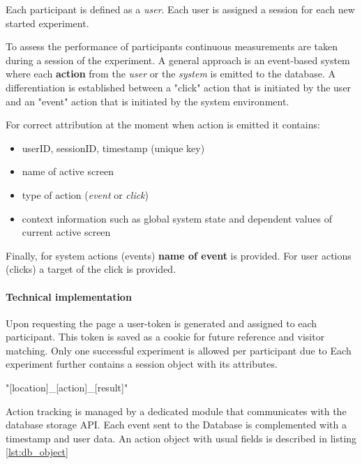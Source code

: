 	
	Each participant is defined as a \textit{user}. Each user is assigned a session for each new started experiment. 
	
	To assess the performance of participants continuous measurements are taken during a session of the experiment. A general approach is an event-based system where each \textbf{action} from the \textit{user} or the \textit{system} is emitted to the database. A differentiation is established between a "click" action that is initiated by the user and an "event" action that is initiated by the system environment.
	
	For correct attribution at the moment when action is emitted it contains: 
	\begin{itemize}
		\item userID, sessionID, timestamp (unique key)
		\item name of active screen
		\item type of action (\textit{event} or \textit{click})
		\item context information such as global system state and dependent values of current active screen
	\end{itemize}

	Finally, for system actions (events) \textbf{name of event} is provided. For user actions (clicks) a target of the click is provided.
	

	

		
		\paragraph{Technical implementation}
		
		Upon requesting the page a user-token is generated and assigned to each participant. This token is saved as a cookie for future reference and visitor matching. Only one successful experiment is allowed per participant due to 
		Each experiment further contains a session object with its attributes. 
		
		"[location]\_[action]\_[result]"
		
		
		Action tracking is managed by a dedicated module that communicates with the database storage API. Each event sent to the Database is complemented with a timestamp and user data. An action object with usual fields is described in listing \ref{lst:db_object}


